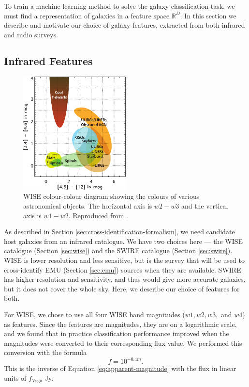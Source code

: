   To train a machine learning method to solve the galaxy classification task,
  we must find a representation of galaxies in a feature space $\mathbb{R}^D$.
  In this section we describe and motivate our choice of galaxy features,
  extracted from both infrared and radio surveys.

  \subsection{Infrared Features}
  \label{sec:ir-features}

    \begin{figure}
      \centering
      \includegraphics[width=0.5\textwidth]{images/wise_colour-colour}
      \caption{WISE colour-colour diagram showing the colours of various
        astronomical objects. The horizontal axis is $w2 - w3$ and the vertical
        axis is $w1 - w2$. Reproduced from \citep{wright10}.}
      \label{fig:wise-colour-colour}
    \end{figure}

    As described in Section \ref{sec:cross-identification-formalism}, we need
    candidate host galaxies from an infrared catalogue. We have two choices here
    --- the WISE catalogue (Section \ref{sec:wise}) and the SWIRE catalogue
    (Section \ref{sec:swire}). WISE is lower resolution and less sensitive, but
    is the survey that will be used to cross-identify EMU (Section
    \ref{sec:emu}) sources when they are available. SWIRE has higher
    resolution and sensitivity, and thus would give more accurate galaxies, but
    it does not cover the whole sky. Here, we describe our choice of features
    for both.

    For WISE, we chose to use all four WISE band magnitudes ($w1, w2, w3,$ and
    $w4$) as features. Since the features are magnitudes, they are on a
    logarithmic scale, and we found that in practice classification performance
    improved when the magnitudes were converted to their corresponding flux
    value. We performed this conversion with the formula
    \begin{equation}
      \label{eq:mag-to-flux}
      f = 10^{-0.4m}.
    \end{equation}
    This is the inverse of Equation \ref{eq:apparent-magnitude} with the flux in
    linear units of $f_{\text{Vega}}$ Jy.

